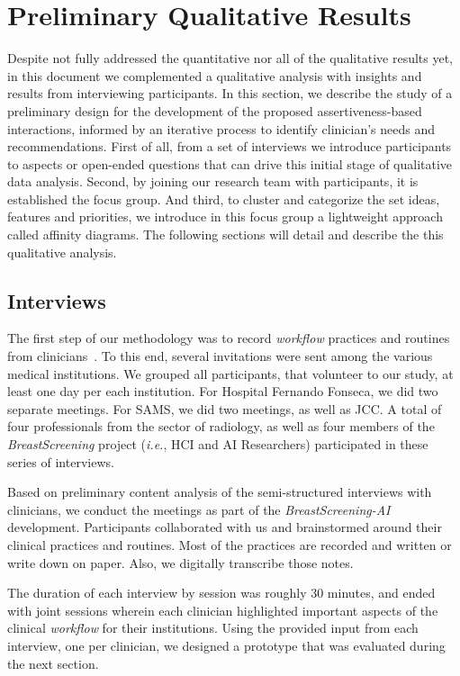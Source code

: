 \section{Preliminary Qualitative Results}
\label{sec:sec005}

Despite not fully addressed the quantitative nor all of the qualitative results yet, in this document we complemented a qualitative analysis with insights and results from interviewing participants.
In this section, we describe the study of a preliminary design for the development of the proposed assertiveness-based interactions, informed by an iterative process to identify clinician's needs and recommendations.
First of all, from a set of interviews we introduce participants to aspects or open-ended questions that can drive this initial stage of qualitative data analysis.
Second, by joining our research team with participants, it is established the focus group.
And third, to cluster and categorize the set ideas, features and priorities, we introduce in this focus group a lightweight approach called affinity diagrams.
The following sections will detail and describe the this qualitative analysis.

\subsection{Interviews}
\label{sec:sec00501}

The first step of our methodology was to record {\it workflow} practices and routines from clinicians~\cite{Hoiseth:2013:RGD:2468356.2468436}.
To this end, several invitations were sent among the various medical institutions.
We grouped all participants, that volunteer to our study, at least one day per each institution.
For Hospital Fernando Fonseca, we did two separate meetings.
For SAMS, we did two meetings, as well as JCC.
A total of four professionals from the sector of radiology, as well as four members of the {\it BreastScreening} project ({\it i.e.}, HCI and AI Researchers) participated in these series of interviews.

Based on preliminary content analysis of the semi-structured interviews with clinicians, we conduct the meetings as part of the {\it BreastScreening-AI} development.
Participants collaborated with us and brainstormed around their clinical practices and routines.
Most of the practices are recorded and written or write down on paper.
Also, we digitally transcribe those notes.

The duration of each interview by session was roughly 30 minutes, and ended with joint sessions wherein each clinician highlighted important aspects of the clinical {\it workflow} for their institutions.
Using the provided input from each interview, one per clinician, we designed a prototype that was evaluated during the next section.

